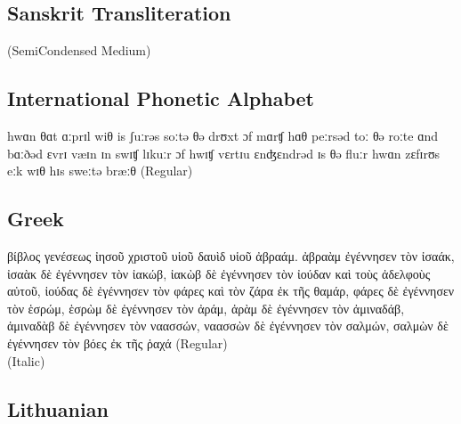{  \subsection*{Sanskrit Transliteration}

 (SemiCondensed Medium)

\subsection*{International Phonetic Alphabet}
{
{\jRegular hwɑn θɑt ɑːprɪl wiθ is ʃuːrəs soːtə θə drʊxt ɔf mɑrʧ hɑθ peːrsəd toː
θə roːte ɑnd bɑːðəd ɛvrɪ væɪn ɪn swɪʧ lɪkuːr ɔf hwɪʧ vɛrtɪu
ɛnʤɛndrəd ɪs θə fluːr hwɑn zɛfɪrʊs eːk wɪθ hɪs sweːtə bræːθ}} (Regular)

\subsection*{Greek}
{\jRegular{} βίβλος
γενέσεως ἰησοῦ χριστοῦ υἱοῦ δαυὶδ
υἱοῦ ἀβραάμ.
ἀβραὰμ
ἐγέννησεν τὸν ἰσαάκ, ἰσαὰκ δὲ ἐγέννησεν
τὸν ἰακώβ, ἰακὼβ δὲ ἐγέννησεν τὸν
ἰούδαν καὶ τοὺς ἀδελφοὺς αὐτοῦ,
ἰούδας
δὲ ἐγέννησεν τὸν φάρες καὶ τὸν ζάρα
ἐκ τῆς θαμάρ, φάρες δὲ ἐγέννησεν τὸν
ἑσρώμ, ἑσρὼμ δὲ ἐγέννησεν τὸν ἀράμ,
ἀρὰμ
δὲ ἐγέννησεν τὸν ἀμιναδάβ, ἀμιναδὰβ
δὲ ἐγέννησεν τὸν ναασσών, ναασσὼν δὲ
ἐγέννησεν τὸν σαλμών,
σαλμὼν
δὲ ἐγέννησεν τὸν βόες ἐκ τῆς ῥαχά} (Regular)\\

 (Italic)

\subsection*{Lithuanian}

}
